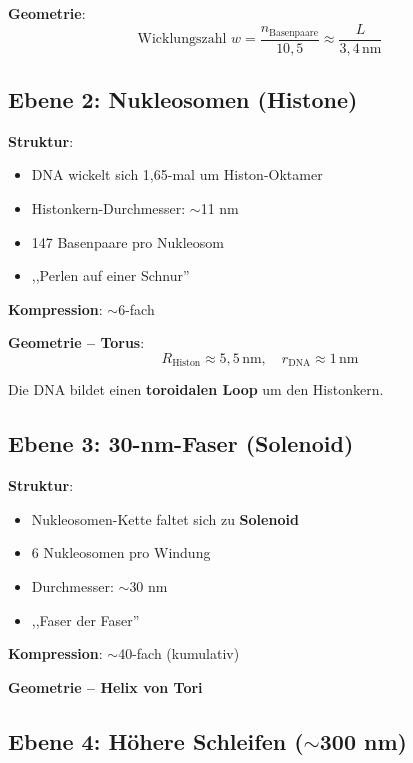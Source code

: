 	\textbf{Geometrie}:
	\begin{equation}
		\text{Wicklungszahl } w = \frac{n_{\text{Basenpaare}}}{10,5} \approx \frac{L}{3,4\,\text{nm}}
	\end{equation}

	\subsection{Ebene 2: Nukleosomen (Histone)}

	\textbf{Struktur}:
	\begin{itemize}
		\item DNA wickelt sich 1,65-mal um Histon-Oktamer
		\item Histonkern-Durchmesser: $\sim$11 nm
		\item 147 Basenpaare pro Nukleosom
		\item ,,Perlen auf einer Schnur''
	\end{itemize}

	\textbf{Kompression}: $\sim$6-fach

	\textbf{Geometrie -- Torus}:
	\begin{equation}
		R_{\text{Histon}} \approx 5{,}5\,\text{nm}, \quad r_{\text{DNA}} \approx 1\,\text{nm}
	\end{equation}

	Die DNA bildet einen \textbf{toroidalen Loop} um den Histonkern.

	\subsection{Ebene 3: 30-nm-Faser (Solenoid)}

	\textbf{Struktur}:
	\begin{itemize}
		\item Nukleosomen-Kette faltet sich zu \textbf{Solenoid}
		\item 6 Nukleosomen pro Windung
		\item Durchmesser: $\sim$30 nm
		\item ,,Faser der Faser''
	\end{itemize}

	\textbf{Kompression}: $\sim$40-fach (kumulativ)

	\textbf{Geometrie -- Helix von Tori}

	\subsection{Ebene 4: Höhere Schleifen ($\sim$300 nm)}

